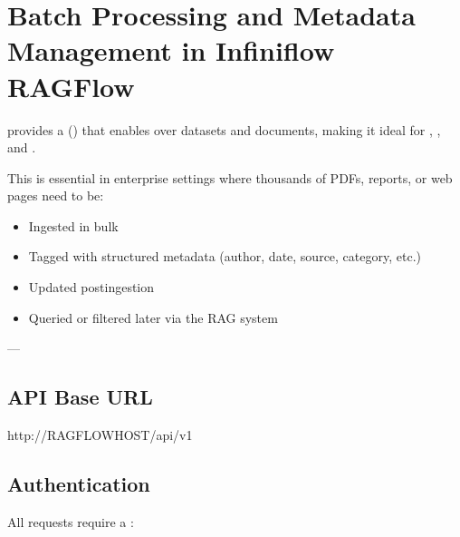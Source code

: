 \documentclass[letterpaper,10pt,english]{sphinxmanual}
\begin{document}
\sphinxstepscope


\chapter{Batch Processing and Metadata Management in Infiniflow RAGFlow}
\label{\detokenize{api:batch-processing-and-metadata-management-in-infiniflow-ragflow}}\label{\detokenize{api:ragflow-batch-api}}\label{\detokenize{api::doc}}
\sphinxAtStartPar
{} provides a  () that enables  over datasets and documents, making it ideal for , , and .

\sphinxAtStartPar
This is essential in enterprise settings where thousands of PDFs, reports, or web pages need to be:
\begin{itemize}
\item {} 
\sphinxAtStartPar
Ingested in bulk

\item {} 
\sphinxAtStartPar
Tagged with structured metadata (author, date, source, category, etc.)

\item {} 
\sphinxAtStartPar
Updated post\sphinxhyphen{}ingestion

\item {} 
\sphinxAtStartPar
Queried or filtered later via the RAG system

\end{itemize}

\sphinxAtStartPar
—


\section{API Base URL}
\label{\detokenize{api:api-base-url}}
\begin{sphinxVerbatim}[commandchars=\\\{\}]
http://\PYGZlt{}RAGFLOW\PYGZus{}HOST\PYGZgt{}/api/v1
\end{sphinxVerbatim}


\section{Authentication}
\label{\detokenize{api:authentication}}
\sphinxAtStartPar
All requests require a :
\end{document}
